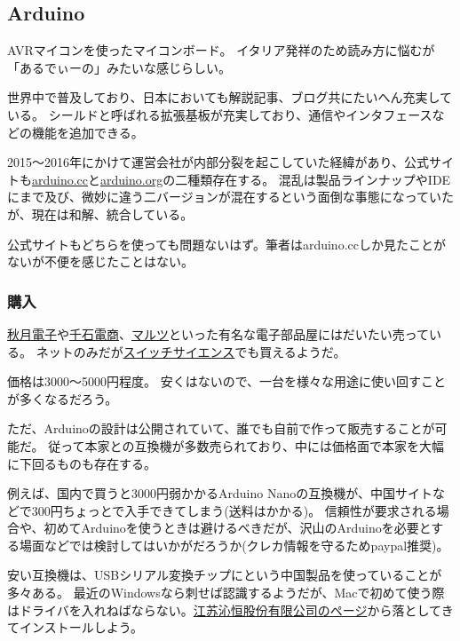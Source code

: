 \documentclass[letterpaper,10pt,dvipdfmx]{sphinxmanual}
\begin{document}
\subsection{Arduino}
\label{\detokenize{begginers/microcontroller:arduino}}
AVRマイコンを使ったマイコンボード。
イタリア発祥のため読み方に悩むが「あるでぃーの」みたいな感じらしい。

世界中で普及しており、日本においても解説記事、ブログ共にたいへん充実している。
シールドと呼ばれる拡張基板が充実しており、通信やインタフェースなどの機能を追加できる。

2015〜2016年にかけて運営会社が内部分裂を起こしていた経緯があり、公式サイトも\href{http://www.arduino.cc}{arduino.cc}と\href{http://www.arduino.org}{arduino.org}の二種類存在する。
混乱は製品ラインナップやIDEにまで及び、微妙に違う二バージョンが混在するという面倒な事態になっていたが、現在は和解、統合している。

公式サイトもどちらを使っても問題ないはず。筆者はarduino.ccしか見たことがないが不便を感じたことはない。


\subsubsection{購入}
\label{\detokenize{begginers/microcontroller:id5}}
\href{http://akizukidenshi.com/catalog/c/carduino1/}{秋月電子}や\href{http://www.sengoku.co.jp/mod/sgk\_cart/search.php?cid=4186}{千石電商}、\href{http://www.marutsu.co.jp/GoodsListNavi.jsp?narrow1Cond=Arduino}{マルツ}といった有名な電子部品屋にはだいたい売っている。
ネットのみだが\href{https://www.switch-science.com/catalog/list/40/}{スイッチサイエンス}でも買えるようだ。

価格は3000〜5000円程度。
安くはないので、一台を様々な用途に使い回すことが多くなるだろう。

ただ、Arduinoの設計は公開されていて、誰でも自前で作って販売することが可能だ。
従って本家との互換機が多数売られており、中には価格面で本家を大幅に下回るものも存在する。

例えば、国内で買うと3000円弱かかるArduino
Nanoの互換機が、中国サイトなどで300円ちょっとで入手できてしまう(送料はかかる)。
信頼性が要求される場合や、初めてArduinoを使うときは避けるべきだが、沢山のArduinoを必要とする場面などでは検討してはいかがだろうか(クレカ情報を守るためpaypal推奨)。

安い互換機は、USBシリアル変換チップにという中国製品を使っていることが多々ある。
最近のWindowsなら刺せば認識するようだが、Macで初めて使う際はドライバを入れねばならない。\href{http://www.wch.cn/download/CH341SER\_MAC\_ZIP.html}{江苏沁恒股份有限公司のページ}から落としてきてインストールしよう。
\end{document}
